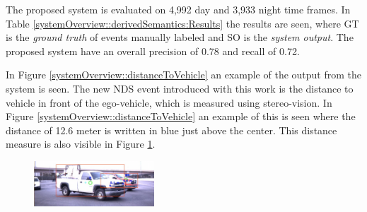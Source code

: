 \begin{multicols}{2}   
The proposed system is evaluated on 4,992 day and 3,933 night time frames. In Table \ref{systemOverview::derivedSemantics:Results} the results are seen, where GT is the \textit{ground truth} of events manually labeled and SO is the \textit{system output}. The proposed system have an overall precision of 0.78 and recall of 0.72.
\begin{center}
\end{center}
In Figure \ref{systemOverview::distanceToVehicle} an example of the output from the system is seen. %
The new NDS event introduced with this work is the distance to vehicle in front of the ego-vehicle, which is measured using stereo-vision. In Figure \ref{systemOverview::distanceToVehicle} an example of this is seen where the distance of 12.6 meter is written in blue just above the center. This distance measure is also visible in Figure \ref{systemOverview::occludedVehicleDetected}.
\begin{figure}[H]
  \centering
  \includegraphics[width=0.4\textwidth]{text/figures/lefttrun2cars.png}
  \label{systemOverview::occludedVehicleDetected}
\end{figure}


\end{multicols}
